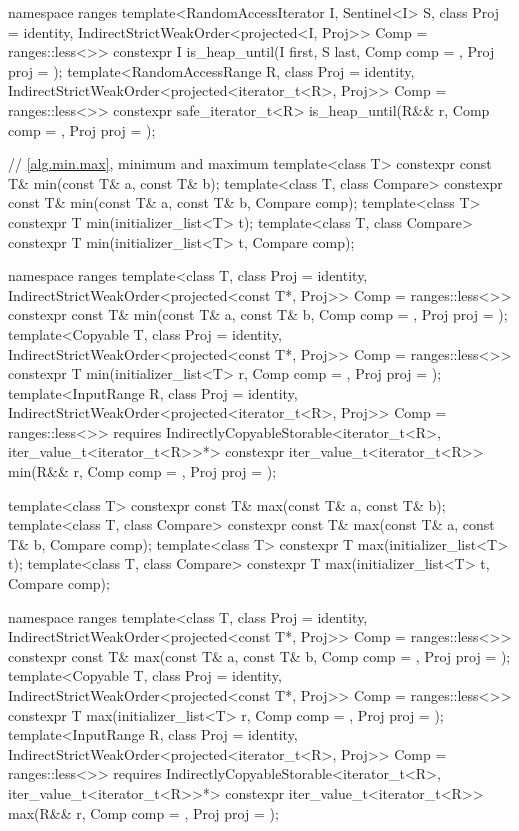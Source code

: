 \begin{codeblock}
{  namespace ranges {
    template<RandomAccessIterator I, Sentinel<I> S, class Proj = identity,
        IndirectStrictWeakOrder<projected<I, Proj>> Comp = ranges::less<>>
      constexpr I is_heap_until(I first, S last, Comp comp = {}, Proj proj = {});
    template<RandomAccessRange R, class Proj = identity,
        IndirectStrictWeakOrder<projected<iterator_t<R>, Proj>> Comp = ranges::less<>>
      constexpr safe_iterator_t<R>
        is_heap_until(R&& r, Comp comp = {}, Proj proj = {});
  }

  // \ref{alg.min.max}, minimum and maximum
  template<class T> constexpr const T& min(const T& a, const T& b);
  template<class T, class Compare>
    constexpr const T& min(const T& a, const T& b, Compare comp);
  template<class T>
    constexpr T min(initializer_list<T> t);
  template<class T, class Compare>
    constexpr T min(initializer_list<T> t, Compare comp);

  namespace ranges {
    template<class T, class Proj = identity,
        IndirectStrictWeakOrder<projected<const T*, Proj>> Comp = ranges::less<>>
      constexpr const T& min(const T& a, const T& b, Comp comp = {}, Proj proj = {});
    template<Copyable T, class Proj = identity,
        IndirectStrictWeakOrder<projected<const T*, Proj>> Comp = ranges::less<>>
      constexpr T min(initializer_list<T> r, Comp comp = {}, Proj proj = {});
    template<InputRange R, class Proj = identity,
        IndirectStrictWeakOrder<projected<iterator_t<R>, Proj>> Comp = ranges::less<>>
      requires IndirectlyCopyableStorable<iterator_t<R>, iter_value_t<iterator_t<R>>*>
      constexpr iter_value_t<iterator_t<R>>
        min(R&& r, Comp comp = {}, Proj proj = {});
  }

  template<class T> constexpr const T& max(const T& a, const T& b);
  template<class T, class Compare>
    constexpr const T& max(const T& a, const T& b, Compare comp);
  template<class T>
    constexpr T max(initializer_list<T> t);
  template<class T, class Compare>
    constexpr T max(initializer_list<T> t, Compare comp);

  namespace ranges {
    template<class T, class Proj = identity,
        IndirectStrictWeakOrder<projected<const T*, Proj>> Comp = ranges::less<>>
      constexpr const T& max(const T& a, const T& b, Comp comp = {}, Proj proj = {});
    template<Copyable T, class Proj = identity,
        IndirectStrictWeakOrder<projected<const T*, Proj>> Comp = ranges::less<>>
      constexpr T max(initializer_list<T> r, Comp comp = {}, Proj proj = {});
    template<InputRange R, class Proj = identity,
        IndirectStrictWeakOrder<projected<iterator_t<R>, Proj>> Comp = ranges::less<>>
      requires IndirectlyCopyableStorable<iterator_t<R>, iter_value_t<iterator_t<R>>*>
      constexpr iter_value_t<iterator_t<R>>
        max(R&& r, Comp comp = {}, Proj proj = {});
  }

}
\end{codeblock}

